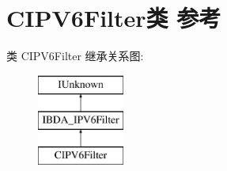 \hypertarget{class_c_i_p_v6_filter}{}\section{C\+I\+P\+V6\+Filter类 参考}
\label{class_c_i_p_v6_filter}
类 C\+I\+P\+V6\+Filter 继承关系图\+:\begin{figure}[H]
\begin{center}
\leavevmode
\includegraphics[height=3.000000cm]{class_c_i_p_v6_filter}
\end{center}
\end{figure}
